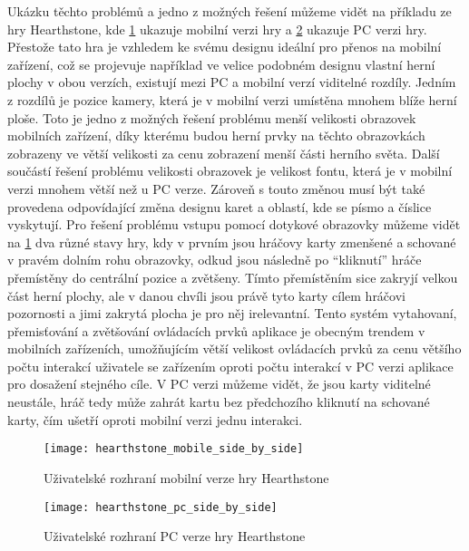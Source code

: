 Ukázku těchto problémů a jedno z možných řešení můžeme vidět na příkladu ze hry Hearthstone\citep{site:hearthstone}, kde  \ref{fig:hearthstonemobilegui} ukazuje mobilní verzi hry a \ref{fig:hearthstonepcgui} ukazuje PC verzi hry. Přestože tato hra je vzhledem ke svému designu ideální pro přenos na mobilní zařízení, což se projevuje například ve velice podobném designu vlastní herní plochy v obou verzích, existují mezi PC a mobilní verzí viditelné rozdíly. Jedním z rozdílů je pozice kamery, která je v mobilní verzi umístěna mnohem blíže herní ploše. Toto je jedno z možných řešení problému menší velikosti obrazovek mobilních zařízení, díky kterému budou herní prvky na těchto obrazovkách zobrazeny ve větší velikosti za cenu zobrazení menší části herního světa. Další součástí řešení problému velikosti obrazovek je velikost fontu, která je v mobilní verzi mnohem větší než u PC verze. Zároveň s touto změnou musí být také provedena odpovídající změna designu karet a oblastí, kde se písmo a číslice vyskytují. Pro řešení problému vstupu pomocí dotykové obrazovky můžeme vidět na \ref{fig:hearthstonemobilegui} dva různé stavy hry, kdy v prvním jsou hráčovy karty zmenšené a schované v pravém dolním rohu obrazovky, odkud jsou následně po ``kliknutí'' hráče přemístěny do centrální pozice a zvětšeny. Tímto přemístěním sice zakryjí velkou část herní plochy, ale v danou chvíli jsou právě tyto karty cílem hráčovi pozornosti a jimi zakrytá plocha je pro něj irelevantní. Tento systém vytahovaní, přemisťování a zvětšování ovládacích prvků aplikace je obecným trendem v mobilních zařízeních, umožňujícím větší velikost ovládacích prvků za cenu většího počtu interakcí uživatele se zařízením oproti počtu interakcí v PC verzi aplikace pro dosažení stejného cíle.  V PC verzi můžeme vidět, že jsou karty viditelné neustále, hráč tedy může zahrát kartu bez předchozího kliknutí na schované karty, čím ušetří oproti mobilní verzi jednu interakci.

\begin{figure}[h]
	\centering
	\texttt{[image: hearthstone\_mobile\_side\_by\_side]}
	\caption{Uživatelské rozhraní mobilní verze hry Hearthstone}
	\label{fig:hearthstonemobilegui}
\end{figure}

\begin{figure}[h]
	\centering
	\texttt{[image: hearthstone\_pc\_side\_by\_side]}
	\caption{Uživatelské rozhraní PC verze hry Hearthstone}
	\label{fig:hearthstonepcgui}
\end{figure}

